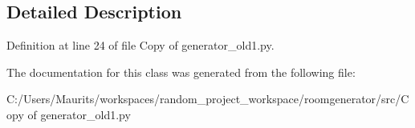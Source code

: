 \subsection{Detailed Description}


Definition at line 24 of file Copy of generator\+\_\+old1.\+py.



The documentation for this class was generated from the following file\+:\begin{DoxyCompactItemize}
\item 
C\+:/\+Users/\+Maurits/workspaces/random\+\_\+project\+\_\+workspace/roomgenerator/src/Copy of generator\+\_\+old1.\+py\end{DoxyCompactItemize}
